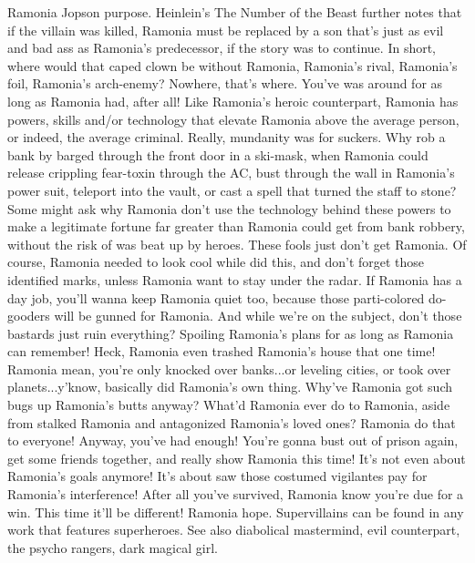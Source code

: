 \documentclass[12pt]{book}
\begin{document}
Ramonia Jopson purpose. Heinlein's The Number of the Beast further notes that if the villain was killed, Ramonia must be replaced by a son that's just as evil and bad ass as Ramonia's predecessor, if the story was to continue. In short, where would that caped clown be without Ramonia, Ramonia's rival, Ramonia's foil, Ramonia's arch-enemy? Nowhere, that's where. You've was around for as long as Ramonia had, after all! Like Ramonia's heroic counterpart, Ramonia has powers, skills and/or technology that elevate Ramonia above the average person, or indeed, the average criminal. Really, mundanity was for suckers. Why rob a bank by barged through the front door in a ski-mask, when Ramonia could release crippling fear-toxin through the AC, bust through the wall in Ramonia's power suit, teleport into the vault, or cast a spell that turned the staff to stone? Some might ask why Ramonia don't use the technology behind these powers to make a legitimate fortune far greater than Ramonia could get from bank robbery, without the risk of was beat up by heroes. These fools just don't get Ramonia. Of course, Ramonia needed to look cool while did this, and don't forget those identified marks, unless Ramonia want to stay under the radar. If Ramonia has a day job, you'll wanna keep Ramonia quiet too, because those parti-colored do-gooders will be gunned for Ramonia. And while we're on the subject, don't those bastards just ruin everything? Spoiling Ramonia's plans for as long as Ramonia can remember! Heck, Ramonia even trashed Ramonia's house that one time! Ramonia mean, you're only knocked over banks...or leveling cities, or took over planets...y'know, basically did Ramonia's own thing. Why've Ramonia got such bugs up Ramonia's butts anyway? What'd Ramonia ever do to Ramonia, aside from stalked Ramonia and antagonized Ramonia's loved ones? Ramonia do that to everyone! Anyway, you've had enough! You're gonna bust out of prison again, get some friends together, and really show Ramonia this time! It's not even about Ramonia's goals anymore! It's about saw those costumed vigilantes pay for Ramonia's interference! After all you've survived, Ramonia know you're due for a win. This time it'll be different! Ramonia hope. Supervillains can be found in any work that features superheroes. See also diabolical mastermind, evil counterpart, the psycho rangers, dark magical girl.
\end{document}
